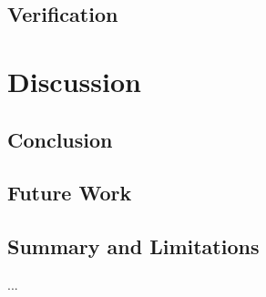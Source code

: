 \documentclass{amia}
\begin{document}
\subsection*{Verification}


\section*{Discussion}
\subsection*{Conclusion}
\subsection*{Future Work}
\subsection*{Summary and Limitations}


...

\clearpage


  
\end{document}
